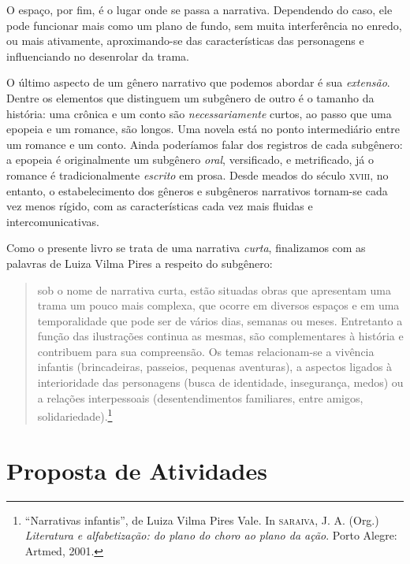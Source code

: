 \documentclass[11pt]{extarticle}
\begin{document}
O espaço, por fim, é o lugar onde se passa a narrativa. Dependendo do caso, ele pode funcionar mais como um plano de fundo, sem muita interferência no enredo, ou mais ativamente, aproximando-se das características das personagens e influenciando no desenrolar da trama. 


O último aspecto de um gênero narrativo que podemos abordar é sua \textit{extensão}. Dentre os elementos que distinguem um subgênero de outro é o tamanho da história: uma crônica e um conto são \textit{necessariamente} curtos, ao passo que uma epopeia e um romance, são longos. Uma novela está no ponto intermediário entre um romance e um conto. Ainda poderíamos falar dos registros de cada subgênero: a epopeia é originalmente um subgênero \textit{oral}, versificado, e metrificado, já o romance é tradicionalmente \textit{escrito} em prosa.  Desde meados do século \textsc{xviii}, no entanto, o estabelecimento dos gêneros e subgêneros narrativos tornam-se cada vez menos rígido, com as características cada vez mais fluidas e intercomunicativas.

Como o presente livro se trata de uma narrativa \textit{curta}, finalizamos com as palavras de Luiza Vilma Pires a respeito do
subgênero:

\begin{quote}
sob o nome de narrativa curta, estão situadas obras que apresentam uma trama um pouco mais complexa, que ocorre em diversos espaços e em uma temporalidade que pode ser de vários dias, semanas ou meses. Entretanto a função das ilustrações continua as mesmas, são complementares à história e contribuem para sua compreensão. Os temas relacionam-se a vivência infantis (brincadeiras, passeios, pequenas aventuras), a aspectos ligados à interioridade das personagens (busca de identidade, insegurança,  
medos) ou a relações interpessoais (desentendimentos familiares, entre amigos, solidariedade).\footnote{“Narrativas infantis”, de Luiza Vilma Pires Vale. In \textsc{saraiva}, J. A. (Org.) \textit{Literatura e alfabetização: do plano do choro ao plano da ação}. Porto Alegre: Artmed, 2001.} 
\end{quote}


\section{Proposta de Atividades}
\end{document}
